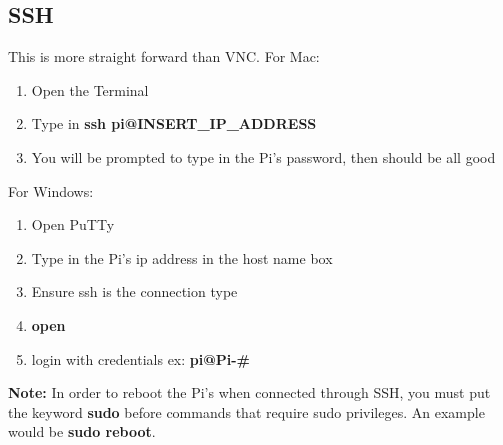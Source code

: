\documentclass[12pt]{extarticle}
\begin{document}
\subsection{SSH}
This is more straight forward than VNC. \newline \newline For Mac:
\begin{enumerate}
  \item Open the Terminal
  \item Type in \textbf{ssh pi@INSERT\_IP\_ADDRESS}
  \item You will be prompted to type in the Pi's password, then should be all good
\end{enumerate}
For Windows:
\begin{enumerate}
  \item Open PuTTy
  \item Type in the Pi's ip address in the host name box
  \item Ensure ssh is the connection type
  \item \textbf{open}
  \item login with credentials ex: \textbf{pi@Pi-\#}
\end{enumerate}
\newline
\textbf{Note: }In order to reboot the Pi's when connected through SSH, you must put the keyword \textbf{sudo} before commands that require sudo privileges. An example would be \textbf{sudo reboot}. 

\newpage
\end{document}
